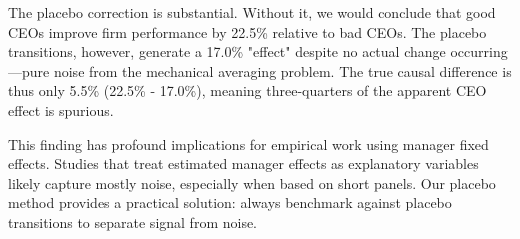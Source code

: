 \documentclass[11pt,a4paper]{article}
\begin{document}
The placebo correction is substantial. Without it, we would conclude that good CEOs improve firm performance by 22.5\% relative to bad CEOs. The placebo transitions, however, generate a 17.0\% "effect" despite no actual change occurring—pure noise from the mechanical averaging problem. The true causal difference is thus only 5.5\% (22.5\% - 17.0\%), meaning three-quarters of the apparent CEO effect is spurious.

This finding has profound implications for empirical work using manager fixed effects. Studies that treat estimated manager effects as explanatory variables likely capture mostly noise, especially when based on short panels. Our placebo method provides a practical solution: always benchmark against placebo transitions to separate signal from noise.
\end{document}

